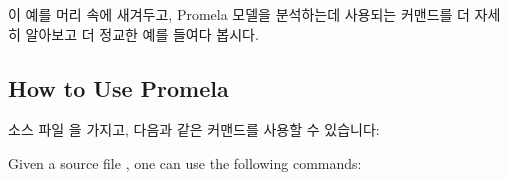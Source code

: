 이 예를 머리 속에 새겨두고, Promela 모델을 분석하는데 사용되는 커맨드를 더
자세히 알아보고 더 정교한 예를 들여다 봅시다.

\iffalse

Running unnecessarily large models is thus subtly discouraged, although
882\,MB is well within the limits of modern desktop and laptop machines.

With this example under our belt, let's take a closer look at the
commands used to analyze Promela models and then look at more
elaborate examples.

\fi

\subsection{How to Use Promela}
\label{sec:formal:How to Use Promela}

소스 파일  을 가지고, 다음과 같은 커맨드를 사용할 수 있습니다:

Given a source file , one can use the following commands:

